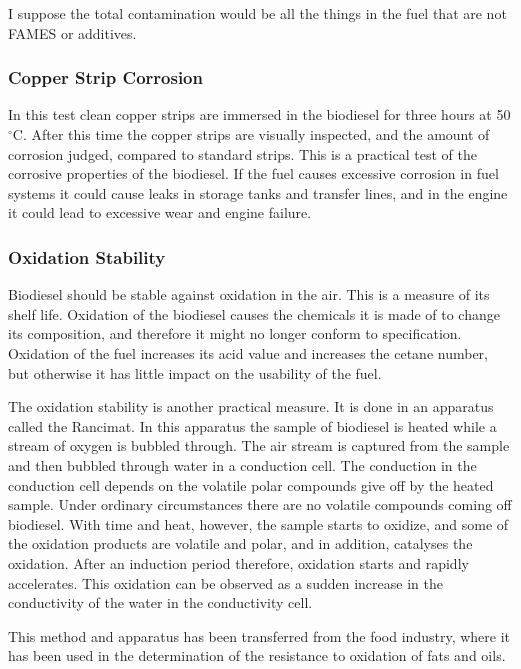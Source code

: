 I suppose the total contamination would be all the things in the fuel that are not FAMES or additives.

\subsubsection{Copper Strip Corrosion}

In this test clean copper strips are immersed in the biodiesel for three hours at 50 $^\circ$C. After this time the copper strips are visually inspected, and the amount of corrosion judged, compared to standard strips. This is a practical test of the corrosive properties of the biodiesel. If the fuel causes excessive corrosion in fuel systems it could cause leaks in storage tanks and transfer lines, and in the engine it could lead to excessive wear and engine failure.

\subsubsection{Oxidation Stability}

Biodiesel should be stable against oxidation in the air. This is a measure of its shelf life. Oxidation of the biodiesel causes the chemicals it is made of to change its composition, and therefore it might no longer conform to specification. Oxidation of the fuel increases its acid value and increases the cetane number, but otherwise it has little impact on the usability of the fuel.

The oxidation stability is another practical measure. It is done in an apparatus called the Rancimat. In this apparatus the sample of biodiesel is heated while a stream of oxygen is bubbled through. The air stream is captured from the sample and then bubbled through water in a conduction cell. The conduction in the conduction cell depends on the volatile polar compounds give off by the heated sample. Under ordinary circumstances there are no volatile compounds coming off biodiesel. With time and heat, however, the sample starts to oxidize, and some of the oxidation products are volatile and polar, and in addition, catalyses the oxidation. After an induction period therefore, oxidation starts and rapidly accelerates. This oxidation can be observed as a sudden increase in the conductivity of the water in the conductivity cell.

This method and apparatus has been transferred from the food industry, where it has been used in the determination of the resistance to oxidation of fats and oils.

